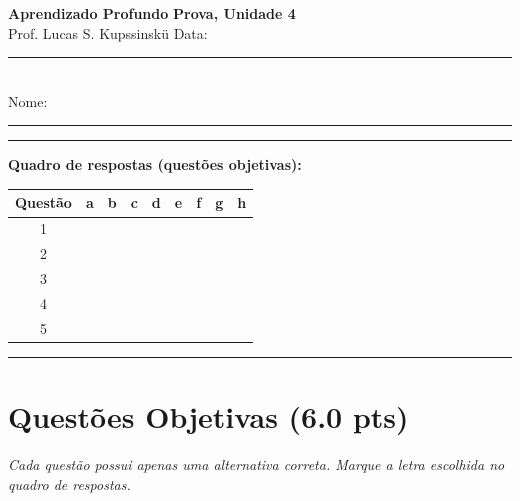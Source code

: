 \documentclass[11pt,a4paper]{article}
\begin{document}
{\Large\bfseries Aprendizado Profundo} \hfill \textbf{Prova, Unidade 4}\\
Prof. Lucas S. Kupssinskü \hfill Data: \rule{3cm}{0.4pt}\\[0.4em]
Nome: \rule{12cm}{0.4pt}

\rule{\linewidth}{0.8pt}

\textbf{Quadro de respostas (questões objetivas):}\\[0.3em]
\begin{center}
\begin{tabular}{|c|c|c|c|c|c|c|c|c|}
\hline
\textbf{Questão} & \textbf{a} & \textbf{b} & \textbf{c} & \textbf{d} & \textbf{e} & \textbf{f} & \textbf{g} & \textbf{h} \\\hline
1 & & & & & & & & \\\hline
2 & & & & & & & & \\\hline
3 & & & & & & & & \\\hline
4 & & & & & & & & \\\hline
5 & & & & & & & & \\\hline
\end{tabular}
\end{center}

\rule{\linewidth}{0.4pt}

\section*{Questões Objetivas (6.0 pts)}
\textit{Cada questão possui apenas uma alternativa correta. Marque a letra escolhida no quadro de respostas.}
\end{document}

